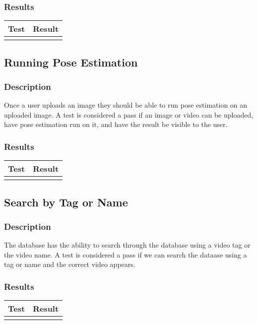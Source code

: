 \documentclass{scrreprt}
\begin{document}
\subsubsection{Results}
 \centering
 \begin{tabular}{||p{2.5cm}|p{2.5cm}||}
 \hline
 \bf Test & \bf Result\\
 \hline\hline
   &  \\ %
 \hline
 \end{tabular}

\subsection{Running Pose Estimation}
\subsubsection{Description}
Once a user uploads an image they should be able to run pose estimation on an uploaded image. A test is considered a pass if an image or video can be uploaded, have pose estimation run on it, and have the result be visible to the user.
\subsubsection{Results}
 \centering
 \begin{tabular}{||p{2.5cm}|p{2.5cm}||}
 \hline
 \bf Test & \bf Result\\
 \hline\hline
   &  \\ %
 \hline
 \end{tabular}

\subsection{Search by Tag or Name}
\subsubsection{Description}
The database has the ability to search through the database using a video tag or the video name. A test is considered a pass if we can search the dataase using a tag or name and the correct video appears.
\subsubsection{Results}
 \centering
 \begin{tabular}{||p{2.5cm}|p{2.5cm}||}
 \hline
 \bf Test & \bf Result\\
 \hline\hline
   &  \\ %
 \hline
 \end{tabular}
\end{document}
